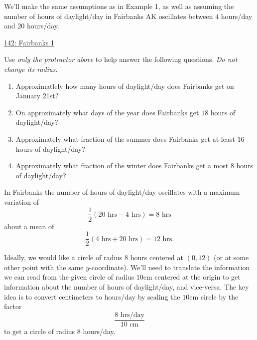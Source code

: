\documentclass{ximera}
\begin{document}
\begin{example} \label{Ex:PDFIRgv4rr}
We'll make the same assumptions as in Example 1, as well as assuming the number of hours of daylight/day in Fairbanks AK oscillates between $4$ hours/day and $20$ hours/day.

\begin{onlineOnly}
    \begin{center}
\end{center}
\end{onlineOnly}

\href{https://www.desmos.com/calculator/nfihqizmdm}{142: Fairbanks 1}

Use \emph{only the protractor above} to help answer the following questions. \emph{Do not change its radius.}

\begin{enumerate}
\item Approximatlely how many hours of daylight/day does Fairbanks get on January 21st?

\item On approximately what days of the year does Fairbanks get $18$ hours of daylight/day? 

\item Approximately what fraction of the summer does Fairbanks get at least $16$ hours of daylight/day?

\item Approximately what fraction of the winter does Fairbanks get a most $8$ hours of daylight/day?

\end{enumerate}

\begin{explanation}


In Fairbanks the number of hours of daylight/day oscillates with a maximum variation of
\[
  \frac{1}{2}\left(20 \text{ hrs} - 4\text{ hrs}  \right) = 8 \text{ hrs}
\]
about a mean of
\[
       \frac{1}{2}\left(4 \text{ hrs} + 20\text{ hrs}  \right) = 12 \text{ hrs} .    
\]

Ideally, we would like a circle of radius $8$ hours centered at $(0,12)$ (or at some other point with the same $y$-coordinate). We'll need to translate the information we can read from the given circle of radius $10$cm centered at the origin to get information about the number of hours of daylight/day, and vice-versa. The key idea is to convert centimeters to hours/day by scaling the $10$cm circle by the factor
\[
   \frac{8 \text{ hrs/day}}{10 \text{ cm}} 
\] 
to get a circle of radius $8$ hours/day. 
\begin{enumerate}


\end{enumerate}
\end{explanation}
\end{example}
\end{document}
